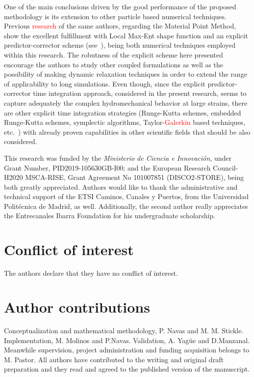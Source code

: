 \documentclass[twocolumn]{svjour3}          %
\begin{document}
One of the main conclusions driven by the good performance of the proposed methodology is its extension to other particle based numerical techniques. Previous \textcolor{red}{research} of the same authors, regarding the Material Point Method, show the excellent fulfillment with Local Max-Ent shape function and an explicit predictor-corrector scheme (see~\cite{Molinos2021,Molinos2021b}), being both numerical techniques employed within this research. The robutness of the explicit scheme here presented encourage the authors to study other coupled formulations as well as the possibility of making dynamic relaxation techniques in order to extend the range of applicability to long simulations. Even though, since the explicit predictor-corrector time integration approach, considered in the present research, seems to capture adequately the complex hydromechanical behavior at large strains, there are other explicit time integration strategies (Runge-Kutta schemes, embedded Runge-Kutta schemes, symplectic algorithms, Taylor-\textcolor{red}{Galerkin} based techniques, etc.~\cite{ODE1,BlancPastor2012,Torabi2020}) with already proven capabilities in other scientific fields that should be also considered.

\begin{acknowledgements}
This research was funded by the \textit{Ministerio de Ciencia e Innovaci\'on}, under Grant Number, PID2019-105630GB-I00; and the European
Research Council-H2020 MSCA-RISE, Grant Agreement No 101007851 (DISCO2-STORE), being both greatly appreciated. Authors would like to thank the administrative and technical support of the ETSI Caminos, Canales y Puertos, from the Universidad Polit\'ecnica de Madrid, as well. Additionally, the second author really appreciates the Entrecanales Ibarra Foundation for his undergraduate scholarship.
\end{acknowledgements}


%
\section*{Conflict of interest}
The authors declare that they have no conflict of interest.

\section*{Author contributions}
Conceptualization and mathematical methodology, P. Navas and M. M. Stickle. Implementation, M. Molinos and P.Navas. Validation, A. Yag\"ue and D.Manzanal. Meanwhile supervision, project administration and funding acquisition belongs to M. Pastor. All authors have contributed to the writing and original draft preparation and they read and agreed to the published version of the manuscript.
\end{document}
